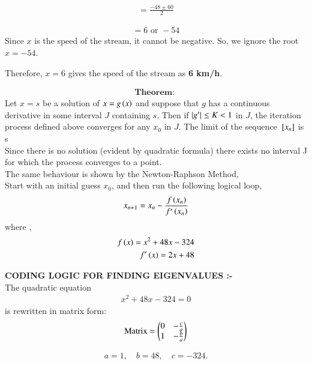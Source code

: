 \documentclass[article]{IEEEtran}
\numberwithin{figure}{enumi}
\begin{document}
\begin{align}
= \frac{-48 \pm 60}{2}
\end{align}

\begin{align}
= 6 \text{ or } -54
\end{align}
Since \( x \) is the speed of the stream, it cannot be negative. So, we ignore the root \( x = -54 \). 

Therefore, \( x = 6 \) gives the speed of the stream as \textbf{6 km/h}.

\begin{align}
    \textbf{Theorem: }
\end{align}
    Let $x = s$ be a solution of $x = g\left(x\right)$ and suppose that $g$ has a continuous
    derivative in some interval $J$ containing $s$. Then if $\left\vert g^{\prime}\right\vert \le K < 1$ in $J$,
    the iteration process defined  above converges for any $x_0$ in $J$. The limit of the sequence
    ${}\left[x_n\right]$ is s\\
\newline
Since there is no solution (evident by quadratic formula) there exists no interval J for which
the process converges to a point.\\
\newline
The same behaviour is shown by the Newton-Raphson Method,\\
Start with an initial guess $x_0$, and then run the following logical loop,
\begin{align}
    x_{n+1} = x_n - \frac{f\left(x_n\right)}{f^{\prime}\left(x_n\right)} 
\end{align}
where ,
\begin{align}
    f\left(x\right) = x^2 + 48x - 324\\
    f^{\prime}\left(x\right) = 2x+48
\end{align}




\textbf{CODING LOGIC FOR FINDING EIGENVALUES :-}\\


The quadratic equation 
\begin{align}
x^2 + 48x - 324 = 0
\end{align}
is rewritten in matrix form:
\begin{align}
\text{Matrix} =
\begin{pmatrix}0 & -\frac{c}{a} \\
1 & -\frac{b}{a}
\end{pmatrix}
\end{align}

\begin{align}
a = 1, \quad b = 48, \quad c =-324.
\end{align}
\end{document}

